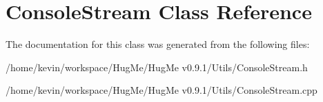 \hypertarget{classConsoleStream}{
\section{ConsoleStream Class Reference}
\label{classConsoleStream}
}


The documentation for this class was generated from the following files:\begin{DoxyCompactItemize}
\item 
/home/kevin/workspace/HugMe/HugMe v0.9.1/Utils/ConsoleStream.h\item 
/home/kevin/workspace/HugMe/HugMe v0.9.1/Utils/ConsoleStream.cpp\end{DoxyCompactItemize}
